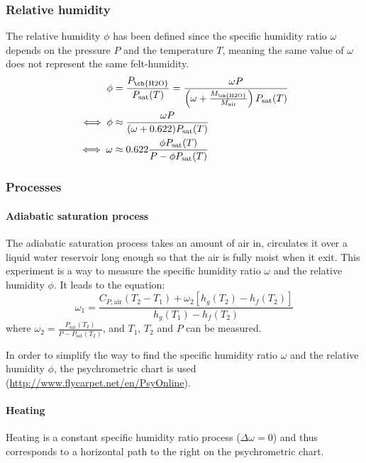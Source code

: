 \documentclass[10pt, twocolumn]{article}
\begin{document}
\subsubsection{Relative humidity}
The relative humidity \(\phi\) has been defined since the specific humidity ratio \(\omega\) depends on the pressure \(P\) and the temperature \(T\), meaning the same value of \(\omega\) does not represent the same felt-humidity.
\begin{align*}
  \phi        & = \frac{P_\mathrm{\ch{H2O}}}{P_\mathrm{sat}(T)} = \frac{\omega P}{\left( \omega + \frac{M_\mathrm{\ch{H2O}}}{M_\mathrm{air}} \right)P_\mathrm{sat}(T)} \\
  \iff \phi   & \approx \frac{\omega P}{( \omega + 0.622 )P_\mathrm{sat}(T)}                                                                                           \\
  \iff \omega & \approx 0.622 \frac{\phi P_\mathrm{sat}(T)}{P - \phi P_\mathrm{sat}(T)}
\end{align*}


\subsubsection{Processes}
\paragraph{Adiabatic saturation process}
The adiabatic saturation process takes an amount of air in, circulates it over a liquid water reservoir long enough so that the air is fully moist when it exit.
This experiment is a way to measure the specific humidity ratio \(\omega\) and the relative humidity \(\phi\).
It leads to the equation:
\[
  \omega_1 = \frac{C_{P,\mathrm{air}} (T_2 - T_1) + \omega_2 \left[ h_g(T_2) - h_f(T_2) \right]}{h_g(T_1) - h_f(T_2)}
\]
where \(\omega_2 = \frac{P_\mathrm{sat}(T_2)}{P - P_\mathrm{sat}(T_2)}\), and \(T_1\), \(T_2\) and \(P\) can be measured.

In order to simplify the way to find the specific humidity ratio \(\omega\) and the relative humidity \(\phi\), the psychrometric chart is used (\url{http://www.flycarpet.net/en/PsyOnline}).

\paragraph{Heating}
Heating is a constant specific humidity ratio process (\(\Delta\omega = 0\)) and thus corresponds to a horizontal path to the right on the psychrometric chart.
\end{document}
